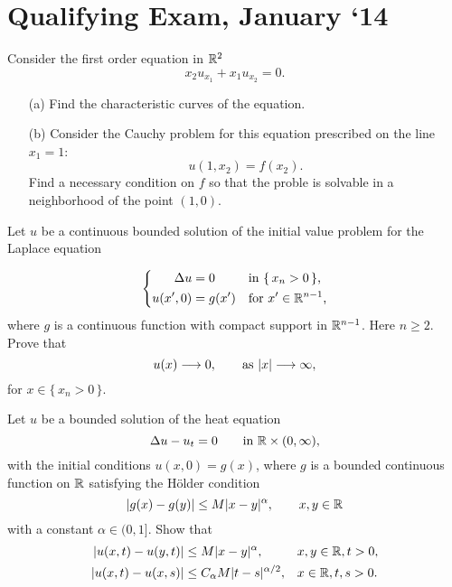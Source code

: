 \section{Qualifying Exam, January `14}
\begin{problem}
  Consider the first order equation in \(\mathbb{R}^2\)
  \[
    x_2u_{x_1}+x_1u_{x_2}=0.
  \]
  \begin{itemize}[noitemsep]
  \item[(a)] Find the characteristic curves of the equation.
  \item[(b)] Consider the Cauchy problem for this equation prescribed on
    the line \(x_1=1\):
    \[
      u(1,x_2)=f(x_2).
    \]
    Find a necessary condition on \(f\) so that the proble is solvable in a
    neighborhood of the point \((1,0)\).
  \end{itemize}
\end{problem}
\begin{solution}
\end{solution}

\begin{problem}
  Let \(u\) be a continuous bounded solution of the initial value problem
  for the Laplace equation

  \[
    \left\{
      \begin{aligned}
        \Delta u&=0&&\text{in \(\{\,x_n>0\,\}\),}\\
        u(x',0)&=g(x')&&\text{for \(x'\in\mathbb{R}^{n-1}\),}
      \end{aligned}
    \right.
  \]
  where \(g\) is a continuous function with compact support in
  \(\mathbb{R}^{n-1}\). Here \(n\geq 2\). Prove that
  \[
    u(x)\To 0,\qquad%
    \text{as } |x|\To \infty,
  \]
  for \(x\in\{\,x_n>0\,\}\).
\end{problem}
\begin{solution}
\end{solution}

\begin{problem}
  Let \(u\) be a bounded solution of the heat equation
  \[
    \Delta u-u_t=0\qquad\text{in \(\mathbb{R}\times(0,\infty)\),}
  \]
  with the initial conditions \(u(x,0)=g(x)\), where \(g\) is a bounded
  continuous function on \(\mathbb{R}\) satisfying the Hölder condition
  \[
    |g(x)-g(y)|\leq M|x-y|^\alpha,\qquad x,y\in\mathbb{R}
  \]
  with a constant \(\alpha\in (0, 1]\). Show that
  \[
    \begin{aligned}
      |u(x,t)-u(y,t)|&\leq M|x-y|^\alpha,&&x,y\in\mathbb{R},t>0,\\
      |u(x,t)-u(x,s)|&\leq C_\alpha M|t-s|^{\alpha/2},&&x\in\mathbb{R},t,s>0.
    \end{aligned}
  \]

  \noindent [\emph{Hint:} For the last inequality, in the representation
  formula of \(u(x,t)\) as a convolution with the heat kernel
  \(\Phi(y,t)\), make a change of variables \(z=y/\sqrt{t}\) and use that
  $\left|\sqrt{t}-\sqrt{s}\right|\leq\sqrt{|t-s|}$.]
\end{problem}
\begin{solution}
\end{solution}


